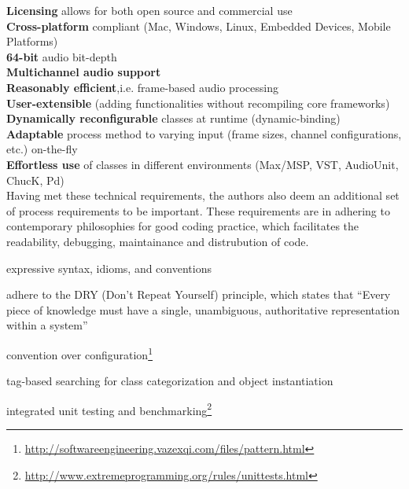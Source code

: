 \documentclass[twoside,10pt]{article}
\newenvironment{packed_item}{
\begin{itemize}
  \setlength{\itemsep}{1pt}
  \setlength{\parskip}{0pt}
  \setlength{\parsep}{0pt}
}{\end{itemize}}
\begin{document}
\noindent\textbf{Licensing} allows for both open source and commercial use\\
	\textbf{Cross-platform} compliant (Mac, Windows, Linux, Embedded Devices, Mobile Platforms)\\	
	\textbf{64-bit} audio bit-depth\\
	\textbf{Multichannel audio support}\\
	\textbf{Reasonably efficient},i.e. frame-based audio processing\\
	\textbf{User-extensible} (adding functionalities without recompiling core frameworks)\\
	\textbf{Dynamically reconfigurable} classes at runtime (dynamic-binding)\\
	\textbf{Adaptable} process method to varying input (frame sizes, channel configurations, etc.) on-the-fly\\
	\textbf{Effortless use} of classes in different environments (Max/MSP, VST, AudioUnit, ChucK, Pd)\\


\noindent Having met these technical requirements, the authors also deem an additional set of process requirements to be important.  These requirements are in adhering to contemporary philosophies for good coding practice, 
which facilitates the readability, debugging, maintainance and distrubution of code. 

\begin{packed_item}%
	\item expressive syntax, idioms, and conventions
	\item adhere to the DRY (Don't Repeat Yourself) principle, which states that ``Every piece of knowledge must have a single, unambiguous, authoritative representation within a system''\cite{Hunt:1999}
	\item convention over configuration\footnote{\url{http://softwareengineering.vazexqi.com/files/pattern.html}}
	\item tag-based searching for class categorization and object instantiation
	\item integrated unit testing and benchmarking\footnote{\url{http://www.extremeprogramming.org/rules/unittests.html}}
\end{packed_item}%
\end{document}
